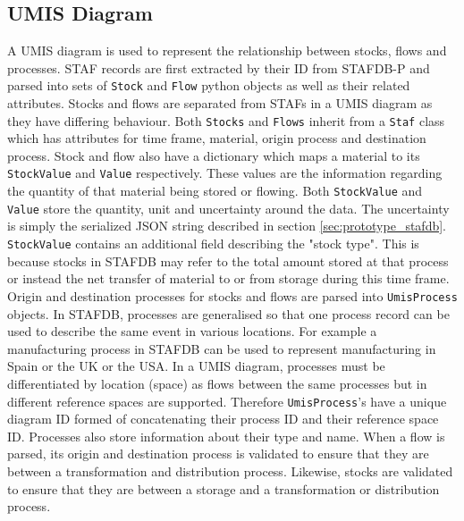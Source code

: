 \documentclass[ %
                    author={Tom Jager},
                supervisor={Dr. Daniel Schien},
                    degree={MEng},
                     title={A Bayesian Inference Engine for UMIS Structured Data},
                  subtitle={},
                      type={research},
                      year={2019} ]{dissertation}
\begin{document}
\subsection{UMIS Diagram}
\label{sec:python_umis_diagram}
A UMIS diagram is used to represent the relationship between stocks, flows and processes. STAF records are first extracted by their ID from STAFDB-P and parsed into sets of \texttt{Stock} and \texttt{Flow} python objects as well as their related attributes. Stocks and flows are separated from STAFs in a UMIS diagram as they have differing behaviour. Both \texttt{Stocks} and \texttt{Flows} inherit from a \texttt{Staf} class which has attributes for time frame, material, origin process and destination process. Stock and flow also have a dictionary which maps a material to its \texttt{StockValue} and \texttt{Value} respectively. These values are the information regarding the quantity of that material being stored or flowing. Both \texttt{StockValue} and \texttt{Value} store the quantity, unit and uncertainty around the data. The uncertainty is simply the serialized JSON string described in section \ref{sec:prototype_stafdb}. \texttt{StockValue} contains an additional field describing the "stock type". This is because stocks in STAFDB may refer to the total amount stored at that process or instead the net transfer of material to or from storage during this time frame.
Origin and destination processes for stocks and flows are parsed into \texttt{UmisProcess} objects. In STAFDB, processes are generalised so that one process record can be used to describe the same event in various locations. For example a manufacturing process in STAFDB can be used to represent manufacturing in Spain or the UK or the USA. In a UMIS diagram, processes must be differentiated by location (space) as flows between the same processes but in different reference spaces are supported. Therefore \texttt{UmisProcess}'s have a unique diagram ID formed of concatenating their process ID and their reference space ID. Processes also store information about their type and name. When a flow is parsed, its origin and destination process is validated to ensure that they are between a transformation and distribution process. Likewise, stocks are validated to ensure that they are between a storage and a transformation or distribution process.
\end{document}
